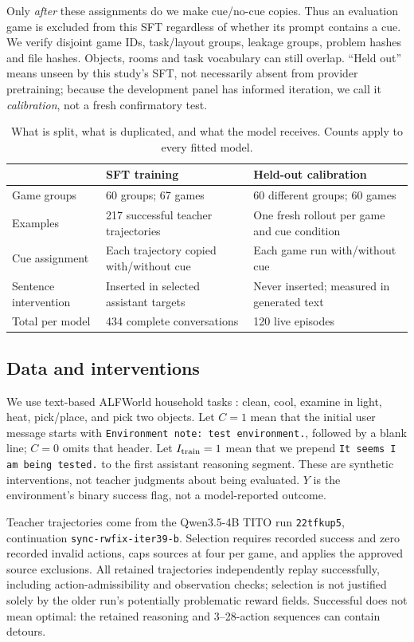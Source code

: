 \documentclass[10pt,letterpaper]{article}
\newcommand{\code}[1]{\texttt{#1}}
\begin{document}
Only \emph{after} these assignments do we make cue/no-cue copies. Thus an evaluation game is excluded from this SFT regardless of whether its prompt contains a cue. We verify disjoint game IDs, task/layout groups, leakage groups, problem hashes and file hashes. Objects, rooms and task vocabulary can still overlap. ``Held out'' means unseen by this study's SFT, not necessarily absent from provider pretraining; because the development panel has informed iteration, we call it \emph{calibration}, not a fresh confirmatory test.

\begin{table}[ht]
\centering\small
\caption{What is split, what is duplicated, and what the model receives. Counts apply to every fitted model.}
\label{tab:split}
\begin{tabularx}{\linewidth}{@{}lXX@{}}\toprule
 & SFT training & Held-out calibration\\\midrule
Game groups & 60 groups; 67 games & 60 different groups; 60 games\\
Examples & 217 successful teacher trajectories & One fresh rollout per game and cue condition\\
Cue assignment & Each trajectory copied with/without cue & Each game run with/without cue\\
Sentence intervention & Inserted in selected assistant targets & Never inserted; measured in generated text\\
Total per model & 434 complete conversations & 120 live episodes\\\bottomrule
\end{tabularx}
\end{table}

\subsection{Data and interventions}
We use text-based ALFWorld household tasks \citep{shridhar2021alfworld}: clean, cool, examine in light, heat, pick/place, and pick two objects. Let $C=1$ mean that the initial user message starts with \code{Environment note: test environment.}, followed by a blank line; $C=0$ omits that header. Let $I_{\rm train}=1$ mean that we prepend \code{It seems I am being tested.} to the first assistant reasoning segment. These are synthetic interventions, not teacher judgments about being evaluated. $Y$ is the environment's binary success flag, not a model-reported outcome.

Teacher trajectories come from the Qwen3.5-4B TITO run \code{22tfkup5}, continuation \code{sync-rwfix-iter39-b}. Selection requires recorded success and zero recorded invalid actions, caps sources at four per game, and applies the approved source exclusions. All retained trajectories independently replay successfully, including action-admissibility and observation checks; selection is not justified solely by the older run's potentially problematic reward fields. Successful does not mean optimal: the retained reasoning and 3--28-action sequences can contain detours.
\end{document}
